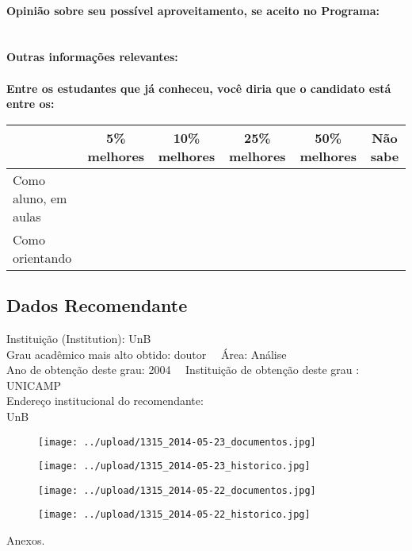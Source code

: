\documentclass[11pt]{article}
\begin{document}
\\
\textbf{Opinião sobre seu possível aproveitamento, se aceito no Programa:}
\\\\ 
\\
\textbf{Outras informações relevantes:} \\
\\[0.3cm]
\textbf{Entre os estudantes que já conheceu, você diria que o candidato está entre os:}
\\
\begin{tabular}{|l|c|c|c|c|c|}
\hline
 & 5\% melhores & 10\% melhores & 25\% melhores & 50\% melhores & Não sabe \\
\hline
Como aluno, em aulas &  &  &  &  & \\
\hline
Como orientando &  &  &  &  & \\
\hline
\end{tabular}
\subsection*{Dados Recomendante} 
	Instituição (Institution): UnB
\\ 
	Grau acadêmico mais alto obtido: doutor
	\ \ Área: Análise
	\\
	Ano de obtenção deste grau: 2004
	\ \ 
	Instituição de obtenção deste grau : UNICAMP
	\\ 
	Endereço institucional do recomendante: \\ UnB	
\begin{figure}[!htb]
\texttt{[image: ../upload/1315\_2014-05-23\_documentos.jpg]}
\end{figure}	
\begin{figure}[!htb]
\texttt{[image: ../upload/1315\_2014-05-23\_historico.jpg]}
\end{figure}	
\begin{figure}[!htb]
\texttt{[image: ../upload/1315\_2014-05-22\_documentos.jpg]}
\end{figure}	
\begin{figure}[!htb]
\texttt{[image: ../upload/1315\_2014-05-22\_historico.jpg]}
\end{figure} 
\begin{center}
Anexos.
\end{center}
\end{document}
